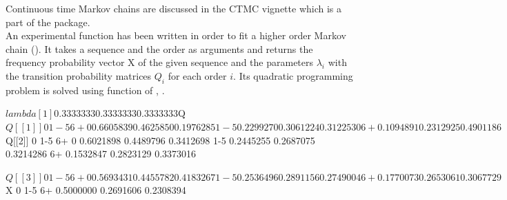 \documentclass[nojss]{jss}
\begin{document}
Continuous time Markov chains are discussed in the CTMC vignette which is a part of the package.\\

An experimental  function has been written in order to fit a higher order Markov chain (\cite{ching2013higher, ching2008higher}). 
It takes a sequence and the order as arguments and returns the frequency probability vector X of the given sequence and the parameters $\lambda_i$ with the transition probability matrices $Q_i$ for each order $i$.
Its quadratic programming problem is solved using  function of , \cite{pkg:Rsolnp}. 

\begin{Schunk}
\begin{Soutput}
$lambda
[1] 0.3333333 0.3333333 0.3333333

$Q
$Q[[1]]
            0       1-5        6+
0   0.6605839 0.4625850 0.1976285
1-5 0.2299270 0.3061224 0.3122530
6+  0.1094891 0.2312925 0.4901186

$Q[[2]]
            0       1-5        6+
0   0.6021898 0.4489796 0.3412698
1-5 0.2445255 0.2687075 0.3214286
6+  0.1532847 0.2823129 0.3373016

$Q[[3]]
            0       1-5        6+
0   0.5693431 0.4455782 0.4183267
1-5 0.2536496 0.2891156 0.2749004
6+  0.1770073 0.2653061 0.3067729


$X
        0       1-5        6+ 
0.5000000 0.2691606 0.2308394 
\end{Soutput}
\end{Schunk}
\end{document}
